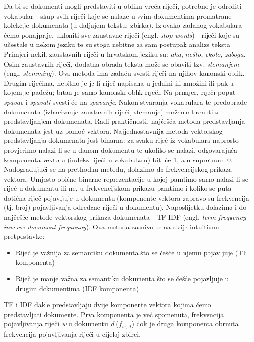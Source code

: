 \documentclass[times, utf8, zavrsni]{fer}
\begin{document}
Da bi se dokumenti mogli predstaviti u obliku vreća riječi, potrebno je odrediti vokabular—skup svih riječi koje se nalaze u svim dokumentima promatrane kolekcije dokumenata (u daljnjem tekstu: zbirka). Iz ovako zadanog vokabulara ćemo ponajprije, ukloniti sve zaustavne riječi (engl. \textit{stop words})—riječi koje su učestale u nekom jeziku te su stoga nebitne za sam postupak analize teksta. Primjeri nekih zaustavnih riječi u hrvatskom jeziku su: \textit{aha}, \textit{nešto}, \textit{okolo}, \textit{zaboga}. Osim zaustavnih riječi, dodatna obrada teksta može se obaviti tzv. \textit{stemanjem} (engl. \textit{stemming}). Ova metoda ima zadaću svesti riječi na njihov kanonski oblik. Drugim riječima, nebitno je je li riječ napisana u jednini ili množini ili pak u kojem je padežu; bitan je samo kanonski oblik riječi. Na primjer, riječi poput \textit{spavao} i \textit{spavati} svesti će na \textit{spavanje}.
Nakon stvaranja vokabulara te predobrade dokumenata (izbacivanje zaustavnih riječi, stemanje) možemo krenuti s predstavljanjem dokumenata. Radi praktičnosti, najčešća metoda predstavljanja dokumenata jest uz pomoć vektora.
Najjednostavnija metoda vektorskog predstavljanja dokumenata jest binarna: za svaku riječ iz vokabulara naprosto provjerimo nalazi li se u danom dokumentu te ukoliko se nalazi, odgovarajuća komponenta vektora (indeks riječi u vokabularu) biti će 1, a u suprotnom 0. Nadograđujući se na prethodnu metodu, dolazimo do frekvencijskog prikaza vektora. Umjesto obične binarne reprezentacije u kojoj pamtimo samo nalazi li se riječ u dokumentu ili ne, u frekvencijskom prikazu pamtimo i koliko se puta dotična riječ pojavljuje u dokumentu (komponente vektora zapravo su frekvencija (tj. broj) pojavljivanja određene riječi u dokumentu). Naposlijetku dolazimo i do najčešće metode vektorskog prikaza dokumenata—TF-IDF (engl. \textit{term frequency–inverse document frequency}). Ova metoda zasniva se na dvije intuitivne pretpostavke:
\begin{itemize}
\item Riječ je važnija za semantiku dokumenta što se češće u njemu pojavljuje (TF komponenta)
\item Riječ je manje važna za semantiku dokumenta što se češće pojavljuje u drugim dokumentima (IDF komponenta)
\end{itemize}
TF i IDF dakle predstavljaju dvije komponente vektora kojima ćemo predstavljati dokumente. Prva komponenta je već spomenuta, frekvencija pojavljivanja riječi \textit{w} u dokumentu \textit{d} ($f_\textit{w, d}$) dok je druga komponenta obrnuta frekvencija pojavljivanja riječi u cijeloj zbirci.
\end{document}
